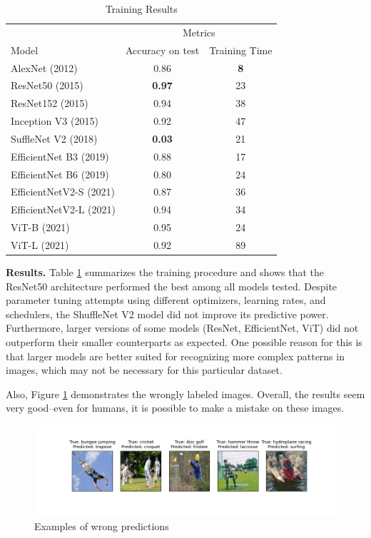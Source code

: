 \documentclass[reqno]{article}
\begin{document}
\begin{table}
	\caption{Training Results}
	\label{results-native}
	\centering
	\renewcommand{\arraystretch}{1.1}
	\begin{tabular}{lcc}
		\toprule
		&\multicolumn{2}{c}{Metrics}                   \\
		\cmidrule(r){2-3}
		Model     & Accuracy on test     & Training Time\\
		\midrule
		AlexNet (2012)    & 0.86       & \textbf{8} \\
		ResNet50 (2015)    & \textbf{0.97}       & 23  \\
		ResNet152 (2015)      & 0.94      & 38   \\
		Inception V3 (2015)      & 0.92       & 47  \\
		SuffleNet V2 (2018)     & \textbf{0.03} & 21 \\
		EfficientNet B3 (2019)  & 0.88     & 17  \\
		EfficientNet B6 (2019)  & 0.80     & 24  \\
		EfficientNetV2-S (2021)   &  0.87   & 36 \\
		EfficientNetV2-L (2021)   &  0.94   & 34 \\		
		ViT-B (2021)   &  0.95   & 24 \\
		ViT-L (2021)   &  0.92   & 89 \\		
		\bottomrule
	\end{tabular}
\end{table}

\textbf{Results.} Table \ref{results-native} summarizes the training procedure and shows that the ResNet50 architecture performed the best among all models tested. Despite parameter tuning attempts using different optimizers, learning rates, and schedulers, the ShuffleNet V2 model did not improve its predictive power. Furthermore, larger versions of some models (ResNet, EfficientNet, ViT) did not outperform their smaller counterparts as expected. One possible reason for this is that larger models are better suited for recognizing more complex patterns in images, which may not be necessary for this particular dataset.

Also, Figure \ref{wrong-images} demonstrates the wrongly labeled images. Overall, the results seem very good--even for humans, it is possible to make a mistake on these images.

	\begin{figure}[ht]
	\centering
	\includegraphics[width=1\linewidth]{Wrong_images}
	\caption{Examples of wrong predictions}
	\label{wrong-images}
\end{figure}
\end{document}
